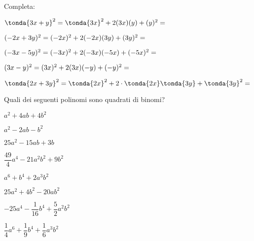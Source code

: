 \begin{esercizio}
\label{ese:11.1}
Completa:

\begin{enumeratea}
\spazielenx
\item \(\tonda{3x + y}^{2} = \tonda{3x}^{2} + 2(3x)(y) + (y)^{2} = 
\dotfill~\)
\item \((-2x + 3y)^{2} = (-2x)^{2} + 2(-2x)(3y) +(3y)^{2} = \dotfill~\)
\item \((-3x -5y)^{2} = (-3x)^{2} + 2(-3x)(-5x)+(-5x)^{2}= \dotfill~\)
\item \((3x - y)^{2} = (3x)^{2} +2(3x)(-y) + (-y)^{2} = \dotfill~\)
\item 
\(\tonda{2x+3y}^{2}=\tonda{2x}^{2} +
2\cdot\tonda{2x}\tonda{3y}+\tonda{3y}^{2}=\dotfill\)
\end{enumeratea}
\end{esercizio}

\begin{esercizio}
\label{ese:11.2}
Quali dei seguenti polinomi sono quadrati di binomi?

\vspace{-.5em}
\begin{htmulticols}{2}
\begin{enumeratea}
\spazielenx
\item \(a^{2}+4{ab}+4b^{2}\) \hfill\sino
\item \(a^{2}-2{ab}-b^{2}\) \hfill\sino
\item \(25a^{2}-15{ab}+3b\) \hfill\sino
\item \(\dfrac{49}{4}a^{4}-21a^{2}b^{2}+9b^{2}\) \hfill\sino
\item \(a^{6}+b^{4}+2a^{3}b^{2}\) \hfill\sino
\item \(25a^{2}+4b^{2}-20{ab}^{2}\) \hfill\sino
\item \(-25a^{4}-\dfrac{1}{16}b^{4}+\dfrac{5}{2}a^{2}b^{2}\) \hfill\sino
\item \(\dfrac{1}{4}a^{6}+\dfrac{1}{9}b^{4}+\dfrac{1}{6}a^{3}b^{2}\) 
\hfill\sino
\end{enumeratea}
\end{htmulticols}
\end{esercizio}

